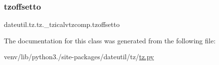 \subsubsection{\texorpdfstring{tzoffsetto}{tzoffsetto}}
{\footnotesize\ttfamily dateutil.\+tz.\+tz.\+\_\+tzicalvtzcomp.\+tzoffsetto}



The documentation for this class was generated from the following file\+:\begin{DoxyCompactItemize}
\item 
venv/lib/python3./site-\/packages/dateutil/tz/\hyperlink{tz_8py}{tz.\+py}\end{DoxyCompactItemize}
